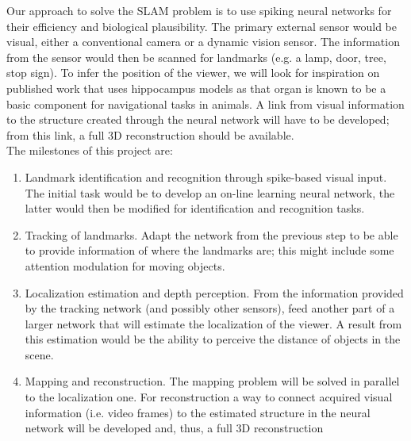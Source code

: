 Our approach to solve the SLAM problem is to use spiking neural networks for their efficiency and biological plausibility. The primary external sensor would be visual, either a conventional camera or a dynamic vision sensor. The information from the sensor would then be scanned for landmarks (e.g. a lamp, door, tree, stop sign). To infer the position of the viewer, we will look for inspiration on published work that uses hippocampus models as that organ is known to be a basic component for navigational tasks in animals. A link from visual information to the structure created through the neural network will have to be developed; from this link, a full 3D reconstruction should be available.\\

The milestones of this project are:
\begin{enumerate}
  \item Landmark identification and recognition through spike-based visual input. The initial task would be to develop an on-line learning neural network, the latter would then be modified for identification and recognition tasks.
  \item Tracking of landmarks. Adapt the network from the previous step to be able to provide information of where the landmarks are; this might include some attention modulation for moving objects.
  \item Localization estimation and depth perception. From the information provided by the tracking network (and possibly other sensors), feed another part of a larger network that will estimate the localization of the viewer. A result from this estimation would be the ability to perceive the distance of objects in the scene. 
  \item Mapping and reconstruction. The mapping problem will be solved in parallel to the localization one. For reconstruction a way to connect acquired visual information (i.e. video frames) to the estimated structure in the neural network will be developed and, thus, a full 3D reconstruction 
\end{enumerate}
